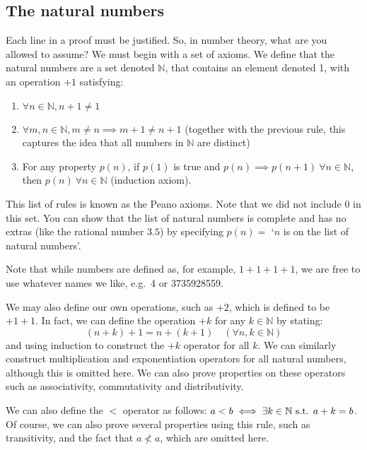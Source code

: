 \subsection{The natural numbers}
Each line in a proof must be justified.
So, in number theory, what are you allowed to assume?
We must begin with a set of axioms.
We define that the natural numbers are a set denoted \(\mathbb N\), that contains an element denoted 1, with an operation \(+1\) satisfying:
\begin{enumerate}
	\item \(\forall n \in \mathbb N, n + 1 \neq 1\)
	\item \(\forall m,n \in \mathbb N, m \neq n \implies m+1 \neq n+1\) (together with the previous rule, this captures the idea that all numbers in \(\mathbb N\) are distinct)
	\item For any property \(p(n)\), if \(p(1)\) is true and \(p(n) \implies p(n+1) \ \forall n \in \mathbb N\), then \(p(n) \ \forall n \in \mathbb N\) (induction axiom).
\end{enumerate}

\noindent This list of rules is known as the Peano axioms.
Note that we did not include 0 in this set.
You can show that the list of natural numbers is complete and has no extras (like the rational number \(3.5\)) by specifying \(p(n)=\) `\(n\) is on the list of natural numbers'.

Note that while numbers are defined as, for example, \(1+1+1+1\), we are free to use whatever names we like, e.g.\ 4 or 3735928559.

We may also define our own operations, such as \(+2\), which is defined to be \(+1+1\).
In fact, we can define the operation \(+k\) for any \(k \in \mathbb N\) by stating:
\[
	(n+k)+1 = n+(k+1) \quad(\forall n, k \in \mathbb N)
\]
\noindent and using induction to construct the \(+k\) operator for all \(k\).
We can similarly construct multiplication and exponentiation operators for all natural numbers, although this is omitted here.
We can also prove properties on these operators such as associativity, commutativity and distributivity.

We can also define the \(<\) operator as follows: \(a < b \iff \exists k \in \mathbb N \text{ s.t. } a + k = b\).
Of course, we can also prove several properties using this rule, such as transitivity, and the fact that \(a \nless a\), which are omitted here.

